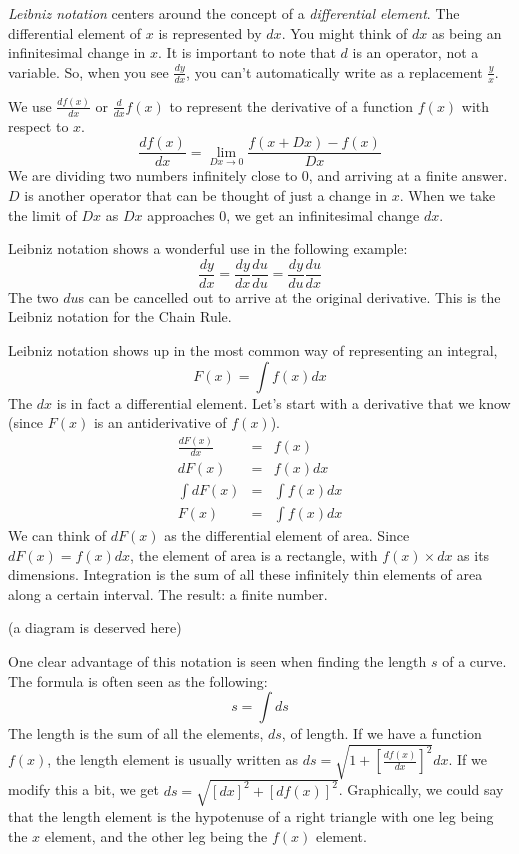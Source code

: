 \documentclass[12pt]{article}
\begin{document}

\emph{Leibniz notation} centers around the concept of a \emph{differential element}.
The differential element of $x$ is represented by $dx$.
You might think of $dx$ as being an infinitesimal change in $x$. It is important
to note that $d$ is an operator, not a variable. So, when you see $\frac{dy}{dx}$,
you can't automatically write as a replacement $\frac{y}{x}$.

We use $\frac{df(x)}{dx}$ or $\frac{d}{dx}f(x)$ to represent the derivative of a
function $f(x)$ with respect to $x$.
$$ \frac{df(x)}{dx} = \lim_{Dx \to 0} \frac{f(x+Dx) - f(x)}{Dx} $$
We are dividing two numbers infinitely close to 0,
and arriving at a finite answer. $D$ is another operator that can be
thought of just a change in $x$. When we take the limit of $Dx$ as $Dx$ approaches 0,
we get an infinitesimal change $dx$.

Leibniz notation shows a wonderful use in the following example:
$$ \frac{dy}{dx} = \frac{dy}{dx} \frac{du}{du} = \frac{dy}{du} \frac{du}{dx} $$
The two $du$s can be cancelled out to arrive at the original derivative.
This is the Leibniz notation for the Chain Rule.

Leibniz notation shows up in the most common way of representing an integral,
$$ F(x) = \int f(x) dx $$
The $dx$ is in fact a differential element. Let's start with a derivative that
we know (since $F(x)$ is an antiderivative of $f(x)$).
\begin{eqnarray*}
\frac{dF(x)}{dx} & = & f(x) \\
dF(x) & = & f(x)dx \\
\int dF(x) & = & \int f(x)dx \\
F(x) & = & \int f(x) dx 
\end{eqnarray*}
We can think of $dF(x)$ as the differential element of area. Since $dF(x) = f(x) dx$,
the element of area is a rectangle, with $f(x) \times dx$ as its dimensions. Integration is
the sum of all these infinitely thin elements of area along a certain interval. The result: a finite number.

(a diagram is deserved here)

One clear advantage of this notation is seen when finding the length $s$ of a curve.
The formula is often seen as the following:
$$ s = \int ds $$
The length is the sum of all the elements, $ds$, of length. If we have a function
$f(x)$, the length element is usually written as $ ds = \sqrt{1+[\frac{df(x)}{dx}]^2} dx $. If we
modify this a bit, we get $ ds = \sqrt{[dx]^2 + [df(x)]^2} $. Graphically, we
could say that the length element is the hypotenuse of a right triangle with one
leg being the $x$ element, and the other leg being the $f(x)$ element.
\end{document}
